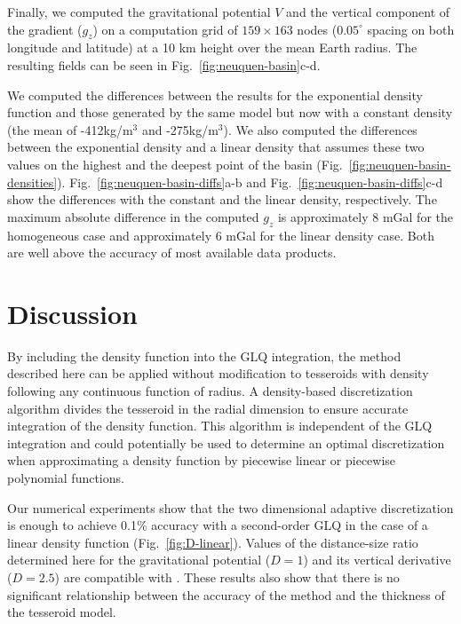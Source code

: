 \documentclass[extra, referee]{gji}
\begin{document}
Finally, we computed the gravitational potential $V$ and the vertical component of the
gradient ($g_z$) on a computation grid of $159\times163$ nodes ($0.05^\circ$ spacing on
both longitude and latitude) at a 10 km height over the mean Earth radius.
The resulting fields can be seen in Fig.~\ref{fig:neuquen-basin}c-d.

We computed the differences between the results for the exponential density function and
those generated by the same model but now with a constant density (the mean of
-412kg/m$^3$ and -275kg/m$^3$).
We also computed the differences between the exponential density and a linear density
that assumes these two values on the highest and the deepest point of the basin
(Fig.~\ref{fig:neuquen-basin-densities}).
Fig.~\ref{fig:neuquen-basin-diffs}a-b and Fig.~\ref{fig:neuquen-basin-diffs}c-d show the
differences with the constant and the linear density, respectively.
The maximum absolute difference in the computed $g_z$ is approximately 8 mGal for the
homogeneous case and approximately 6 mGal for the linear density case.
Both are well above the accuracy of most available data products.



\section{Discussion}

By including the density function into the GLQ integration, the method described here
can be applied without modification to tesseroids with density following any continuous
function of radius.
A density-based discretization algorithm divides the tesseroid in the radial dimension
to ensure accurate integration of the density function.
This algorithm is independent of the GLQ integration and could potentially be used to
determine an optimal discretization when approximating a density function by piecewise
linear \citep{Lin2018} or piecewise polynomial \citep{Fukushima2018} functions.

Our numerical experiments show that the two dimensional adaptive discretization is
enough to achieve 0.1\% accuracy with a second-order GLQ in the case of a linear density
function (Fig.~\ref{fig:D-linear}).
Values of the distance-size ratio determined here for the gravitational potential
($D=1$) and its vertical derivative ($D=2.5$) are compatible with \citet{Uieda2016}.
These results also show that there is no significant relationship between the accuracy
of the method and the thickness of the tesseroid model.
\end{document}
